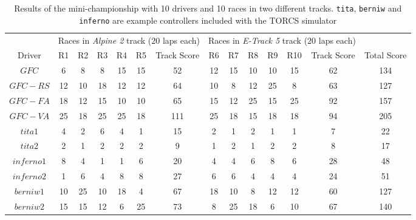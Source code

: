 \documentclass[conference]{IEEEtran}
\begin{document}
%
\begin{table}[ht]
  \centering
  {\scriptsize
    \caption{ Results of the mini-championship with 10 drivers and 10
      races in two different tracks. {\tt tita}, {\tt berniw} and {\tt
      inferno} are example controllers included with the TORCS
    simulator \cite{torcs4}}
    {
			\begin{tabular}{|c||c|c|c|c|c|c||c|c|c|c|c|c||c|}
				\hline
			&\multicolumn{6}{|c|}{Races in \textit{Alpine 2} track (20 laps each)} &	\multicolumn{6}{|c|}{Races in \textit{E-Track 5} track (20 laps each)}&\\
					\cline{2-13}
Driver&{R1}&{R2}&{R3}&{R4}&{R5}&Track Score&{R6}&{R7}&{R8}& {R9}&{R10}&Track Score& Total Score\\
				\hline
$GFC$	&	6&	8&	8&	15&15		&52&	12&	15&	10&	10&	15&62&134\\
$GFC-RS$&	12&	10&	18&	12&12		&64&	10&	8&	12&	25&	8&63&127\\
$GFC-FA$&	18&	12&	15&	10&10		&65&	15&	12&	25&	15&	25&92&157\\
$GFC-VA$&	25&	18&	25&	25&18		&111&	25&	18&	15&	18&18	&94&205\\
$tita1$	&	4&	2&	6&	4&1			&15&	2&	1&	2&	1&	1&7&22\\
$tita2$	&	2&	1&	2&	2&2			&9&	1&	2&	1&	2&	2&8&17\\
$inferno1$&	8&	4&	1&	1&6			&20&	4&	4&	6&	8&	6&28&48\\
$inferno2$&	1&	6&	4&	8&8			&27&	6&	6&	4&	4&	4&24&51\\
$berniw1$&	10&	25&	10&	18&4		&67&	18&	10&	8&	12&	12&60&127\\
$berniw2$&	15&	15&	12&	6&25		&73&	8&	25&	18&	6&	10&67&140\\
\hline
				
			\end{tabular}
		}\label{tab:chsresults}
	}
\end{table}
%
\end{document}
